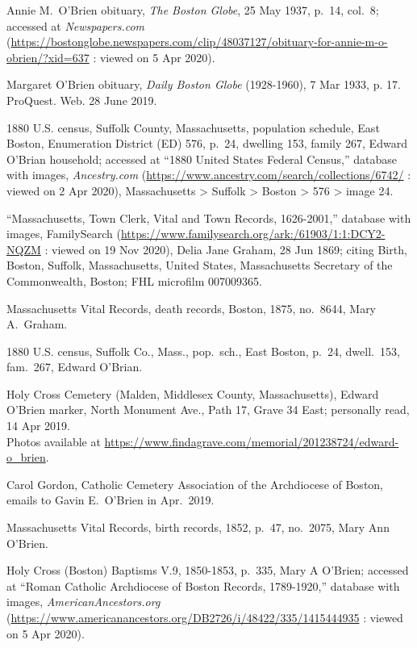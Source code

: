 \begin{thebibliography}{999}
Annie M.\ O'Brien obituary, \textit{The Boston Globe}, 25 May 1937, p.\ 14, col.\ 8; accessed at \textit{Newspapers.com} (\url{https://bostonglobe.newspapers.com/clip/48037127/obituary-for-annie-m-o-obrien/?xid=637} : viewed on 5 Apr 2020).

Margaret O'Brien obituary, \textit{Daily Boston Globe} (1928-1960), 7 Mar 1933, p. 17. ProQuest. Web. 28 June 2019. 

1880 U.S. census, Suffolk County, Massachusetts, population schedule, East Boston, Enumeration District (ED) 576, p.\ 24, dwelling 153, family 267, Edward O'Brian household; accessed at ``1880 United States Federal Census,'' database with images, \textit{Ancestry.com} (\url{https://www.ancestry.com/search/collections/6742/} : viewed on 2 Apr 2020), Massachusetts > Suffolk > Boston > 576 > image 24.

``Massachusetts, Town Clerk, Vital and Town Records, 1626-2001,'' database with images, FamilySearch (\url{https://www.familysearch.org/ark:/61903/1:1:DCY2-NQZM} : viewed on 19 Nov 2020), Delia Jane Graham, 28 Jun 1869; citing Birth, Boston, Suffolk, Massachusetts, United States, Massachusetts Secretary of the Commonwealth, Boston; FHL microfilm 007009365.

Massachusetts Vital Records, death records, Boston, 1875, no.\ 8644, Mary A.\ Graham.

1880 U.S. census, Suffolk Co., Mass., pop.\ sch., East Boston, p.\ 24, dwell.\ 153, fam.\ 267, Edward O'Brian.

Holy Cross Cemetery (Malden, Middlesex County, Massachusetts), Edward O'Brien marker, North Monument Ave., Path 17, Grave 34 East; personally read, 14 Apr 2019. \\
Photos available at \url{https://www.findagrave.com/memorial/201238724/edward-o_brien}.

Carol Gordon, Catholic Cemetery Association of the Archdiocese of Boston, emails to Gavin E.\ O'Brien in Apr.\ 2019.

Massachusetts Vital Records, birth records, 1852, p.\ 47, no.\ 2075, Mary Ann O'Brien.

Holy Cross (Boston) Baptisms V.9, 1850-1853, p.\ 335, Mary A O'Brien; accessed at ``Roman Catholic Archdiocese of Boston Records, 1789-1920,'' database with images, \textit{AmericanAncestors.org} (\url{https://www.americanancestors.org/DB2726/i/48422/335/1415444935} : viewed on 5 Apr 2020).


\end{thebibliography}
